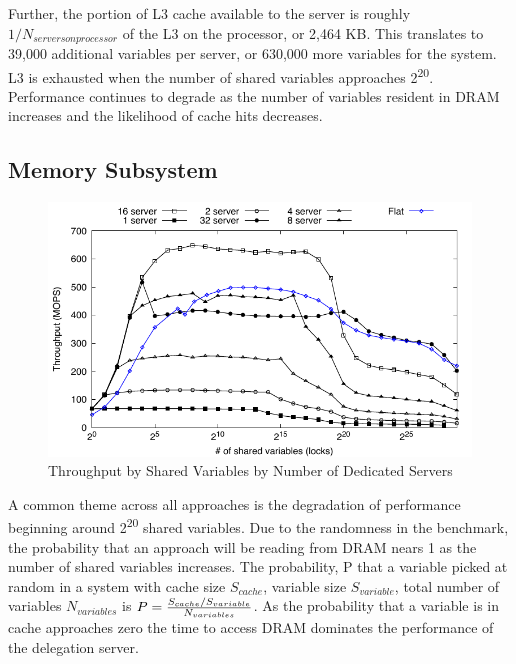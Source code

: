 \documentclass{uicthesi}
\begin{document}
Further, the portion of L3 cache available to the server is roughly $1 / N_{servers on processor}$ of the L3 on the processor, or 2,464 KB. This translates to 39,000 additional variables per server, or 630,000 more variables for the system. L3 is exhausted when the number of shared variables approaches 2\textsuperscript{20}. Performance continues to degrade as the number of variables resident in DRAM increases and the likelihood of cache hits decreases. 


\subsection{Memory Subsystem}

\begin{figure}[ht!]
\centering
\includegraphics[width=0.9\columnwidth]{FIG/fetch_add_dedicated_vary_server.pdf}
\caption{Throughput by Shared Variables by Number of Dedicated Servers}
\label{fig:vary_server}
\end{figure}

A common theme across all approaches is the degradation of performance beginning around 2\textsuperscript{20} shared variables. Due to the randomness in the benchmark, the probability that an approach will be reading from DRAM nears 1 as the number of shared variables increases. The probability, P  that a variable picked at random in a system with cache size $S_{cache}$, variable size $S_{variable}$, total number of variables $N_{variables}$ is $P = {{S_{cache} / S_{variable}} \over N_{variables}}$. As the probability that a variable is in cache approaches zero the time to access DRAM dominates the performance of the delegation server.
\end{document}
